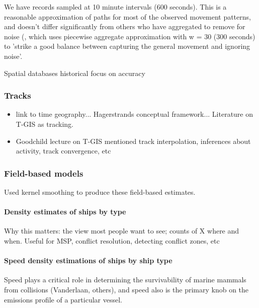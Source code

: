 We have records sampled at 10 minute intervals (600 seconds). This is a reasonable approximation of paths for most of the observed movement patterns, and doesn't differ significantly from others who have aggregated to remove for noise (\cite{Vries2009}, which uses piecewise aggregate approximation with w = 30 (300 seconds) to 'strike a good balance between capturing the general movement and ignoring noise'. %

Spatial databases historical focus on accuracy \citep{goodchild1989accuracy}

\subsubsection{Tracks}
 \begin{itemize}
   \item link to time geography... Hagerstrands conceptual framework... Literature on T-GIS as tracking.
   \item Goodchild lecture on T-GIS mentioned track interpolation, inferences about activity, track convergence, etc

 \end{itemize}

\subsubsection{Field-based models}

Used kernel smoothing to produce these field-based estimates.

\paragraph{Density estimates of ships by type}

Why this matters: the view most people want to see; counts of X where and when. Useful for MSP, conflict resolution, detecting conflict zones, etc

\paragraph{Speed density estimations of ships by ship type}

Speed plays a critical role in determining the survivability of marine mammals from collisions (Vanderlaan, others), and speed also is the primary knob on the emissions profile of a particular vessel.

